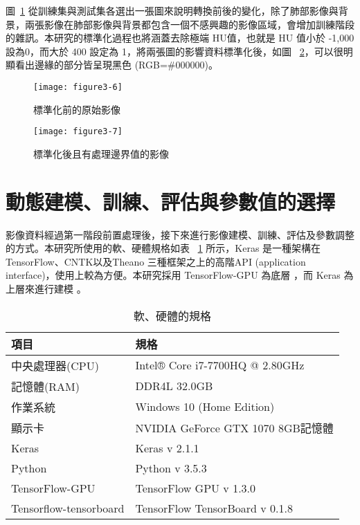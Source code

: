 \documentclass[12pt, a4paper]{article} 				%
\begin{document}
圖~\ref{Figure3-6} 從訓練集與測試集各選出一張圖來說明轉換前後的變化，除了肺部影像與背景，兩張影像在肺部影像與背景都包含一個不感興趣的影像區域，會增加訓練階段的雜訊。本研究的標準化過程也將涵蓋去除極端 HU值，也就是 HU 值小於 -1,000 設為0，而大於 400 設定為 1，將兩張圖的影響資料標準化後，如圖 ~\ref{Figure3-7}，可以很明顯看出邊緣的部分皆呈現黑色 (RGB=\#000000)。

\begin{figure}[!ht]
\begin{center}
\texttt{[image: figure3-6]}
\caption{標準化前的原始影像}\label{Figure3-6}
\end{center}
\end{figure}
\begin{figure}[!ht]
\begin{center}
\texttt{[image: figure3-7]}
\caption{標準化後且有處理邊界值的影像}\label{Figure3-7}
\end{center}
\end{figure}

\section{動態建模、訓練、評估與參數值的選擇}
影像資料經過第一階段前置處理後，接下來進行影像建模、訓練、評估及參數調整的方式。本研究所使用的軟、硬體規格如表 ~\ref{Table4-1} 所示，Keras 是一種架構在 TensorFlow、CNTK以及Theano 三種框架之上的高階API (application interface)，使用上較為方便。本研究採用 TensorFlow-GPU 為底層 ，而 Keras 為上層來進行建模 。

\begin{table}[!ht]
\begin{center}
\caption{軟、硬體的規格}\label{Table4-1}
\begin{tabular}{ll}\toprule
項目	&	規格\\\midrule
中央處理器(CPU)	&	Intel® Core i7-7700HQ @ 2.80GHz\\
記憶體(RAM)	&	DDR4L 32.0GB\\
作業系統	&	Windows 10 (Home Edition)\\
顯示卡	&	NVIDIA GeForce GTX 1070 8GB記憶體\\
Keras	&	Keras v 2.1.1\\
Python	&	Python v 3.5.3\\
TensorFlow-GPU	&	TensorFlow GPU v 1.3.0\\
Tensorflow-tensorboard	&	TensorFlow TensorBoard v 0.1.8\\\bottomrule
\end{tabular}
\end{center}
\end{table}
\end{document}
